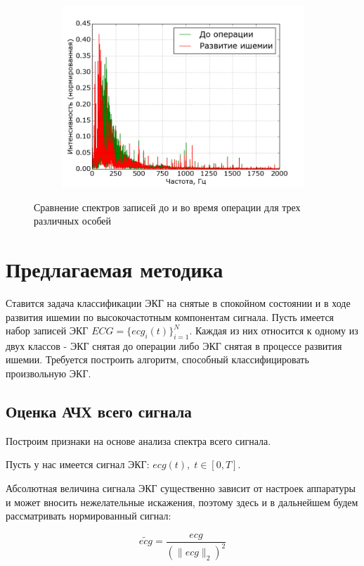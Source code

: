 \documentclass[a4paper,12pt]{extarticle}
\begin{document}
\begin{figure}[H]
\begin{subfigure}[b]{0.31\textwidth}
      \includegraphics[width=\textwidth]{img/ft_comparison_mouse_3.png}
    \end{subfigure}
    \caption{Сравнение спектров записей до и во время операции для трех различных особей}\label{fig:FTComparison}
\end{figure}

\section{Предлагаемая методика}

Ставится задача классификации ЭКГ на снятые в спокойном состоянии и в ходе развития ишемии по высокочастотным компонентам сигнала.
Пусть имеется набор записей ЭКГ $ECG = \{ecg_i(t)\}_{i=1}^N$. Каждая из них относится к одному из двух классов - ЭКГ снятая до операции либо ЭКГ снятая в процессе развития ишемии. Требуется построить алгоритм, способный классифицировать произвольную ЭКГ.

\subsection{Оценка АЧХ всего сигнала}
\label{ssec:WholeSignalFeaturesTheory}
Построим признаки на основе анализа спектра всего сигнала.

Пусть у нас имеется сигнал ЭКГ: $ecg(t),\; t\in [0,T]$. 

Абсолютная величина сигнала ЭКГ существенно зависит от настроек аппаратуры и может вносить нежелательные искажения, поэтому здесь и в дальнейшем будем рассматривать нормированный сигнал:

$$ \widetilde{ecg} = \frac{ecg}{(\|ecg\|_2)^2} $$
\end{document}
